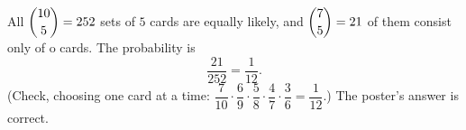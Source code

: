 All $\dbinom{10}{5}=252$ sets of $5$ cards are equally likely, and $\dbinom75=21$ of them consist only of o cards. The probability is
\[
\dfrac{21}{252}=\boxed{\dfrac{1}{12}}.
\]
(Check, choosing one card at a time: $\dfrac{7}{10}\cdot\dfrac{6}{9}\cdot\dfrac{5}{8}\cdot\dfrac{4}{7}\cdot\dfrac{3}{6}=\dfrac{1}{12}$.) The poster's answer is correct.
